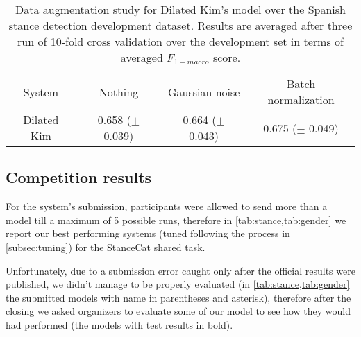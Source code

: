 \begin{table}[h]
	\centering
	\caption{Data augmentation study for Dilated Kim's model over the Spanish stance detection development dataset. Results are averaged after three run of 10-fold cross validation over the development set in terms of averaged $F_{1-macro}$ score. }
	\label{tab:augmentation}
	\begin{tabular}{c|ccc}
		\hline\noalign{\smallskip}
		System		& Nothing	& Gaussian noise	& Batch normalization	\\
		\noalign{\smallskip}
		\hline
		\noalign{\smallskip}
		Dilated Kim	& 0.658 ($\pm$ 0.039) & 0.664 ($\pm$ 0.043)	& 0.675 ($\pm$ 0.049)	\\
		\hline
	\end{tabular}
\end{table}

\subsection{Competition results} \label{subsec:results}

For the system's submission, participants were allowed to send more than a model till a maximum of 5 possible runs, therefore in \cref{tab:stance,tab:gender} we report our best performing systems (tuned following the process in \cref{subsec:tuning}) for the StanceCat shared task.

Unfortunately, due to a submission error caught only after the official results were published, we didn't manage to be properly evaluated (in \cref{tab:stance,tab:gender} the submitted models with name in parentheses and asterisk), therefore after the closing we asked organizers to evaluate some of our model to see how they would had performed (the models with test results in bold).

